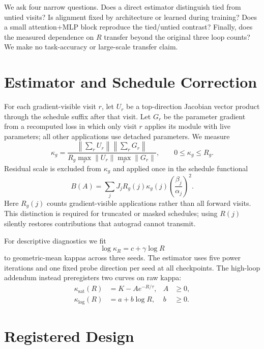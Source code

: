 \documentclass[10pt]{article}
\begin{document}
We ask four narrow questions. Does a direct estimator distinguish tied from
untied visits? Is alignment fixed by architecture or learned during training?
Does a small attention+MLP block reproduce the tied/untied contrast? Finally,
does the measured dependence on $R$ transfer beyond the original three loop
counts? We make no task-accuracy or large-scale transfer claim.

\section{Estimator and Schedule Correction}

For each gradient-visible visit $r$, let $U_r$ be a top-direction Jacobian
vector product through the schedule suffix after that visit. Let $G_r$ be the
parameter gradient from a recomputed loss in which only visit $r$ applies its
module with live parameters; all other applications use detached parameters.
We measure
\begin{equation}
\kappa_g =
\frac{\left\|\sum_r U_r\right\|\left\|\sum_r G_r\right\|}
{R_g\max_r\|U_r\|\max_r\|G_r\|},
\qquad 0\le\kappa_g\le R_g.
\end{equation}
Residual scale is excluded from $\kappa_g$ and applied once in the schedule
functional
\begin{equation}
B(A)=\sum_j J_jR_g(j)\kappa_g(j)
\left(\frac{\beta_j}{\alpha_j}\right)^2.
\end{equation}
Here $R_g(j)$ counts gradient-visible applications rather than all forward
visits. This distinction is required for truncated or masked schedules; using
$R(j)$ silently restores contributions that autograd cannot transmit.

For descriptive diagnostics we fit
\begin{equation}
\log\kappa_R=c+\gamma\log R
\end{equation}
to geometric-mean kappas across three seeds. The estimator uses five power
iterations and one fixed probe direction per seed at all checkpoints. The
high-loop addendum instead preregisters two curves on raw kappa:
\begin{align}
\kappa_{\mathrm{sat}}(R)&=K-Ae^{-R/\tau}, & A&\ge0,\\
\kappa_{\log}(R)&=a+b\log R, & b&\ge0.
\end{align}

\section{Registered Design}
\end{document}
